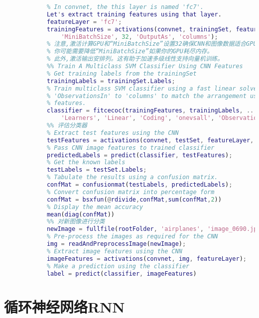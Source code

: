 \begin{lstlisting}[language = Matlab]
            % but typically starting with the layer right before the classification layer is a good place to start.
            % In convnet, the this layer is named 'fc7'.
            Let's extract training features using that layer.
            featureLayer = 'fc7';
            trainingFeatures = activations(convnet, trainingSet, featureLayer, ...
                'MiniBatchSize', 32, 'OutputAs', 'columns');
            % 注意,激活计算GPU和“MiniBatchSize”设置32确保CNN和图像数据适合GPU内存。
            % 你可能需要降低“MiniBatchSize”如果你的GPU耗尽内存。
            % 此外,激活输出安排列。这有助于加速多级线性支持向量机训练。
            %% Train A Multiclass SVM Classifier Using CNN Features
            % Get training labels from the trainingSet
            trainingLabels = trainingSet.Labels;
            % Train multiclass SVM classifier using a fast linear solver, and set
            % 'ObservationsIn' to 'columns' to match the arrangement used for training
            % features.
            classifier = fitcecoc(trainingFeatures, trainingLabels, ...
                'Learners', 'Linear', 'Coding', 'onevsall', 'ObservationsIn', 'columns');
            %% 评估分类器
            % Extract test features using the CNN
            testFeatures = activations(convnet, testSet, featureLayer, 'MiniBatchSize',32);
            % Pass CNN image features to trained classifier
            predictedLabels = predict(classifier, testFeatures);
            % Get the known labels
            testLabels = testSet.Labels;
            % Tabulate the results using a confusion matrix.
            confMat = confusionmat(testLabels, predictedLabels);
            % Convert confusion matrix into percentage form
            confMat = bsxfun(@rdivide,confMat,sum(confMat,2))
            % Display the mean accuracy
            mean(diag(confMat))
            %% 对新图像进行分类
            newImage = fullfile(rootFolder, 'airplanes', 'image_0690.jpg');
            % Pre-process the images as required for the CNN
            img = readAndPreprocessImage(newImage);
            % Extract image features using the CNN
            imageFeatures = activations(convnet, img, featureLayer);
            % Make a prediction using the classifier
            label = predict(classifier, imageFeatures)
            \end{lstlisting}

\section{循环神经网络RNN}

